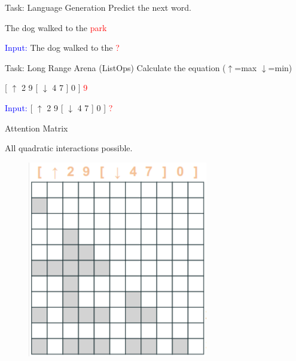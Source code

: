     


\begin{frame}[c]{Task: Language Generation}
    \centering
    Predict the next word.
    \vspace{1.5cm}
    

      The dog walked to the \textcolor{red}{park}
    
    \vspace{1.5cm}
    
        \textcolor{blue}{Input:} The dog walked to the  \textcolor{red}{?}

\end{frame}

\begin{frame}[c]{Task: Long Range Arena (ListOps)}
    \centering
    Calculate the equation ($\uparrow$=max $\downarrow$=min)
    \vspace{1.5cm}

    
     [ $\uparrow$ 2 9 [ $\downarrow$ 4 7 ] 0 ] \textcolor{red}{9}
    
    \vspace{1.5cm}

    
    \textcolor{blue}{Input:}  [ $\uparrow$ 2 9 [ $\downarrow$ 4 7 ] 0 ] \textcolor{red}{?}
\end{frame}



\begin{frame}[c]{Attention Matrix}

    \centering

    \begin{center}
        All quadratic interactions possible.
    \end{center}
    
    \begin{figure}
        \centering
        \includegraphics[height=0.6\textheight, clip,trim={0.1cm 0.1cm 0.1cm 0.1cm}]{Figs/Complex.png}
       \label{fig:my_label}
    \end{figure}
\end{frame}

